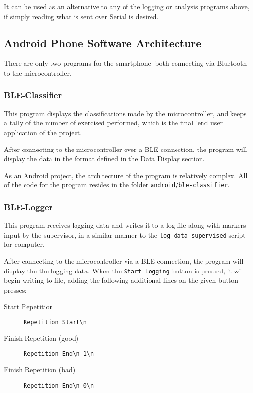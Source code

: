 \documentclass[a4paper]{article}
\begin{document}
It can be used as an alternative to any of the logging or analysis programs above, if simply reading what is sent over Serial is desired.

\subsection{Android Phone Software Architecture}%
\label{subsec:dc_asa}

There are only two programs for the smartphone, both connecting via Bluetooth to the microcontroller.

\subsubsection{BLE-Classifier}
\label{subsubsec:dc_asa_classifier}

This program displays the classifications made by the microcontroller, and keeps a tally of the number of exercised performed, which is the final 'end user' application of the project.

After connecting to the microcontroller over a BLE connection, the program will display the data in the format defined in the \hyperref[subsec:dc_datadisplay]{Data Display section.}

As an Android project, the architecture of the program is relatively complex. All of the code for the program resides in the folder \lstinline{android/ble-classifier}. 


\subsubsection{BLE-Logger}
\label{subsubsec:dc_asa_logger}

This program receives logging data and writes it to a log file along with markers input by the supervisor, in a similar manner to the \lstinline{log-data-supervised} script for computer.

After connecting to the microcontroller via a BLE connection, the program will display the the logging data. When the \lstinline{Start Logging} button is pressed, it will begin writing to file, adding the following additional lines on the given button presses:

\begin{description}
\item[Start Repetition] \lstinline|Repetition Start\n|
\item[Finish Repetition (good)] \lstinline|Repetition End\n 1\n|
\item[Finish Repetition (bad)] \lstinline|Repetition End\n 0\n|
\end{description}
\end{document}
